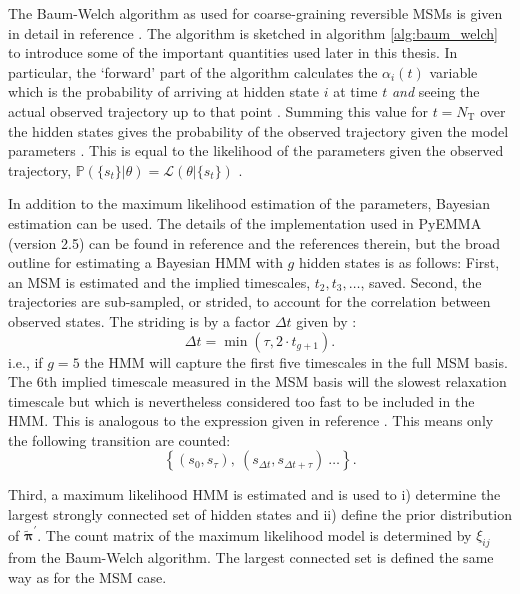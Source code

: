 The Baum-Welch algorithm as used for coarse-graining reversible MSMs is given in detail in reference \cite{noeProjectedHiddenMarkov2013a}. The algorithm is sketched in algorithm \ref{alg:baum_welch} to introduce some of the important quantities used later in this thesis. In particular, the `forward' part of the algorithm calculates the $\alpha_{i}(t)$ variable which is the probability of arriving at hidden state $i$ at time $t$ \emph{and} seeing the actual observed trajectory up to that point \cite{rabinerTutorialHiddenMarkov1989}. Summing this value for $t=N_{\mathrm{T}}$ over the hidden states gives the probability of the observed trajectory given the model parameters \cite{rabinerTutorialHiddenMarkov1989}. This is equal to the likelihood of the parameters given the observed trajectory, $\mathbb{P}(\{s_{t}\}|\theta)=\mathcal{L}(\theta|\{s_{t}\})$ \cite{rabinerTutorialHiddenMarkov1989}. 

In addition to the maximum likelihood estimation of the parameters, Bayesian estimation can be used. The details of the implementation used in PyEMMA (version 2.5) \cite{schererPyEMMASoftwarePackage2015a} can be found in reference \cite{choderaBayesianHiddenMarkov2011a} and the references therein, but the broad outline for estimating a Bayesian HMM with $g$ hidden states is as follows:
First, an MSM is estimated and the implied timescales, $t_{2},t_{3}, \ldots$, saved. Second, the trajectories are sub-sampled, or strided, to account for the correlation between observed states. The striding is by a factor $\Delta t$ given by \cite{schererPyEMMASoftwarePackage2015a}:
\begin{equation}\label{eqn:hmm_striding}
    \Delta t = \min{\left(\tau, 2\cdot t_{g+1}\right)}. 
\end{equation}
i.e., if $g=5$ the HMM will  capture the first five timescales in the full MSM basis. The $6$th implied timescale measured in the MSM basis will the slowest relaxation timescale but which is nevertheless considered too fast to be included in the HMM. This is analogous to the expression given in reference \cite{noeStatisticalInefficiencyMarkov}.  This means only the following transition are counted: 
\begin{equation}
    \left\{(s_{0}, s_{\tau}),\ (s_{\Delta t}, s_{\Delta t + \tau})\ \ldots \right \}.
\end{equation}

Third, a maximum likelihood HMM is estimated and is used to i) determine the largest strongly connected set of hidden states and ii) define the prior distribution of  $\widetilde{\bm{\pi}}^{\prime}$. The count matrix of the maximum likelihood model is determined by $\xi_{ij}$ from the Baum-Welch algorithm. The largest connected set is defined the same way as for the MSM case. 


